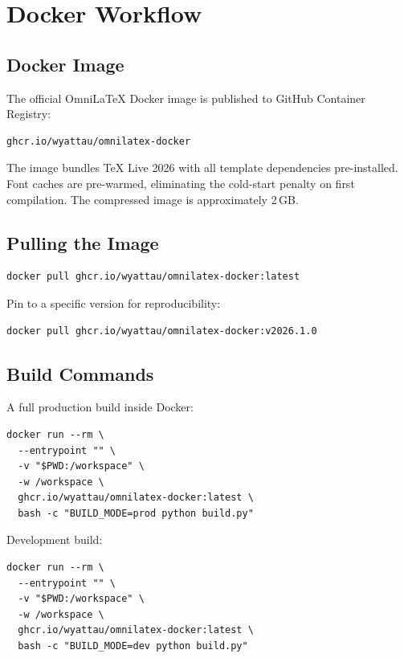 \chapter{Docker Workflow}
\label{ch:docker-workflow}

\section{Docker Image}

The official OmniLaTeX Docker image is published to GitHub Container
Registry:

\begin{verbatim}
ghcr.io/wyattau/omnilatex-docker
\end{verbatim}

The image bundles TeX Live 2026 with all template dependencies pre-installed.
Font caches are pre-warmed, eliminating the cold-start penalty on first
compilation.  The compressed image is approximately 2\,GB.

\section{Pulling the Image}

\begin{verbatim}
docker pull ghcr.io/wyattau/omnilatex-docker:latest
\end{verbatim}

Pin to a specific version for reproducibility:

\begin{verbatim}
docker pull ghcr.io/wyattau/omnilatex-docker:v2026.1.0
\end{verbatim}

\section{Build Commands}

A full production build inside Docker:

\begin{verbatim}
docker run --rm \
  --entrypoint "" \
  -v "$PWD:/workspace" \
  -w /workspace \
  ghcr.io/wyattau/omnilatex-docker:latest \
  bash -c "BUILD_MODE=prod python build.py"
\end{verbatim}

Development build:

\begin{verbatim}
docker run --rm \
  --entrypoint "" \
  -v "$PWD:/workspace" \
  -w /workspace \
  ghcr.io/wyattau/omnilatex-docker:latest \
  bash -c "BUILD_MODE=dev python build.py"
\end{verbatim}

